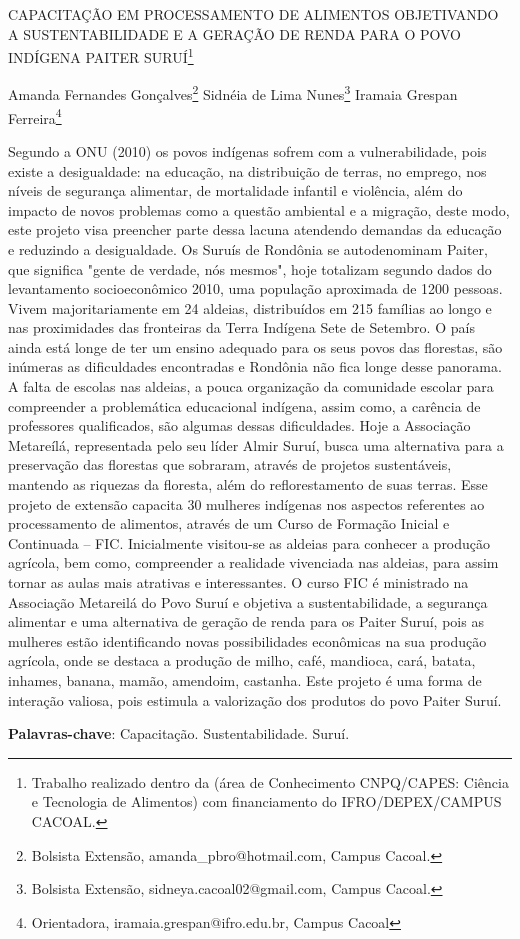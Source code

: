\documentclass[article,12pt,onesidea,4paper,english,brazil]{abntex2}
\begin{document}
	
	
	\frenchspacing 
	
	\begin{center}
		\LARGE CAPACITAÇÃO EM PROCESSAMENTO DE ALIMENTOS OBJETIVANDO A SUSTENTABILIDADE E A GERAÇÃO DE RENDA PARA O POVO INDÍGENA PAITER SURUÍ\footnote{Trabalho realizado dentro da (área de Conhecimento CNPQ/CAPES: Ciência e Tecnologia de Alimentos) com financiamento do IFRO/DEPEX/CAMPUS CACOAL.}
		
		\normalsize
		Amanda Fernandes Gonçalves\footnote{Bolsista Extensão, amanda\_pbro@hotmail.com, Campus Cacoal.} 
		Sidnéia de Lima Nunes\footnote{Bolsista Extensão, sidneya.cacoal02@gmail.com, Campus Cacoal.} 
		Iramaia Grespan Ferreira\footnote{Orientadora, iramaia.grespan@ifro.edu.br, Campus Cacoal} 
		 
	\end{center}
	
	\noindent Segundo a ONU (2010) os povos indígenas sofrem com a vulnerabilidade, pois existe a desigualdade: na educação, na distribuição de terras, no emprego, nos níveis de segurança alimentar, de mortalidade infantil e violência, além do impacto de novos problemas como a questão ambiental e a migração, deste modo, este projeto visa preencher parte dessa lacuna atendendo demandas da educação e reduzindo a desigualdade. Os Suruís de Rondônia se autodenominam Paiter, que significa "gente de verdade, nós mesmos", hoje totalizam segundo dados do levantamento socioeconômico 2010, uma população aproximada de 1200 pessoas. Vivem majoritariamente em 24 aldeias, distribuídos em 215 famílias ao longo e nas proximidades das fronteiras da Terra Indígena Sete de Setembro. O país ainda está longe de ter um ensino adequado para os seus povos das florestas, são inúmeras as dificuldades encontradas e Rondônia não fica longe desse panorama. A falta de escolas nas aldeias, a pouca organização da comunidade escolar para compreender a problemática educacional indígena, assim como, a carência de professores qualificados, são algumas dessas dificuldades. Hoje a Associação Metareílá, representada pelo seu líder Almir Suruí, busca uma alternativa para a preservação das florestas que sobraram, através de projetos sustentáveis, mantendo as riquezas da floresta, além do reflorestamento de suas terras. Esse projeto de extensão capacita 30 mulheres indígenas nos aspectos referentes ao processamento de alimentos, através de um Curso de Formação Inicial e Continuada – FIC. Inicialmente visitou-se as aldeias para conhecer a produção agrícola, bem como, compreender a realidade vivenciada nas aldeias, para assim tornar as aulas mais atrativas e interessantes. O curso FIC é ministrado na Associação Metareilá do Povo Suruí e objetiva a sustentabilidade, a segurança alimentar e uma alternativa de geração de renda para os Paiter Suruí, pois as mulheres estão identificando novas possibilidades econômicas na sua produção agrícola, onde se destaca a produção de milho, café, mandioca, cará, batata, inhames, banana, mamão, amendoim, castanha. Este projeto é uma forma de interação valiosa, pois estimula a valorização dos produtos do povo Paiter Suruí.
	
	\vspace{\onelineskip}
	
	\noindent
	\textbf{Palavras-chave}: Capacitação. Sustentabilidade. Suruí.
	
\end{document}
